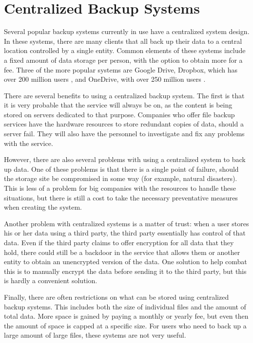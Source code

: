 \documentclass[12pt]{report}
\begin{document}
\section{Centralized Backup Systems}
Several popular backup systems currently in use have a centralized system design. In these systems, there are many clients that all back up their data to a central location controlled by a single entity. Common elements of these systems include a fixed amount of data storage per person, with the option to obtain more for a fee. Three of the more popular systems are Google Drive, Dropbox, which has over 200 million users \cite{dropboxusers}, and OneDrive, with over 250 million users \cite{onedriveusers}.

There are several benefits to using a centralized backup system. The first is that it is very probable that the service will always be on, as the content is being stored on servers dedicated to that purpose. Companies who offer file backup services have the hardware resources to store redundant copies of data, should a server fail. They will also have the personnel to investigate and fix any problems with the service.

However, there are also several problems with using a centralized system to back up data. One of these problems is that there is a single point of failure, should the storage site be compromised in some way (for example, natural disasters). This is less of a problem for big companies with the resources to handle these situations, but there is still a cost to take the necessary preventative measures when creating the system.

Another problem with centralized systems is a matter of trust: when a user stores his or her data using a third party, the third party essentially has control of that data. Even if the third party claims to offer encryption for all data that they hold, there could still be a backdoor in the service that allows them or another entity to obtain an unencrypted version of the data. One solution to help combat this is to manually encrypt the data before sending it to the third party, but this is hardly a convenient solution.

Finally, there are often restrictions on what can be stored using centralized backup systems. This includes both the size of individual files and the amount of total data. More space is gained by paying a monthly or yearly fee, but even then the amount of space is capped at a specific size. For users who need to back up a large amount of large files, these systems are not very useful.
\end{document}

